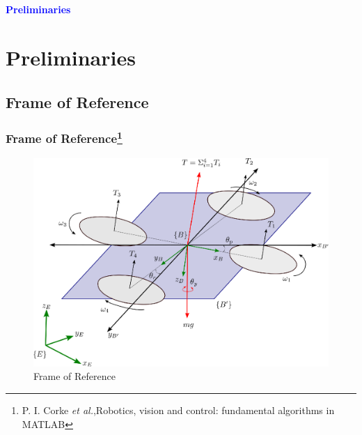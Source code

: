 \documentclass[10pt]{beamer}
\begin{document}
\section*{}
\begin{frame}{}
	\huge{\centerline{\textcolor{blue}{\textbf{Preliminaries}}}}
\end{frame}
\section{Preliminaries}
\subsection*{Frame of Reference}
\begin{frame}
	\frametitle{Frame of Reference\footnote{P. I. Corke \textit{et al.},Robotics, vision and control: fundamental algorithms in MATLAB}}
	\begin{figure}[h!]
		\centering
		\includegraphics[scale=0.5]{Quadcopter.eps}
		\caption{Frame of Reference}
		\label{Fig:Frame_of_Reference.}
	\end{figure}
\end{frame}
\end{document}
